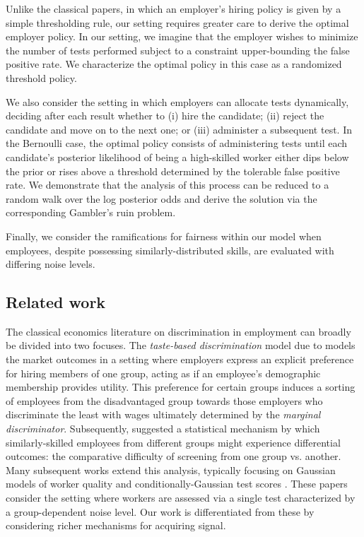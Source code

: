 Unlike the classical papers, 
in which an employer's hiring policy is given 
by a simple thresholding rule,
our setting requires greater care 
to derive the optimal employer policy. 
In our setting, we imagine that the employer 
wishes to minimize the number of tests performed
subject to a constraint upper-bounding the false positive rate.
We characterize the optimal policy in this case as a randomized threshold policy.

We also consider the setting in which employers can allocate tests dynamically, 
deciding after each result whether to 
(i) hire the candidate;
(ii) reject the candidate and move on to the next one; or 
(iii) administer a subsequent test. 
In the Bernoulli case, the optimal policy consists 
of administering tests until each candidate's posterior likelihood 
of being a high-skilled worker either 
dips below the prior or rises above a threshold 
determined by the tolerable false positive rate.
We demonstrate that the analysis of this process
can be reduced to a random walk over the log posterior odds
and derive the solution via the corresponding Gambler's ruin problem.

Finally, 
we consider the ramifications for fairness within our model 
when employees, despite possessing similarly-distributed skills, 
are evaluated with differing noise levels.

\subsection{Related work}

The classical economics literature 
on discrimination in employment 
can broadly be divided into two focuses.
The \emph{taste-based discrimination} model 
due to \cite{becker1957economics}
models the market outcomes in a setting 
where employers express an explicit preference 
for hiring members of one group,
acting as if an employee's demographic membership provides utility.
This preference for certain groups
induces a sorting of employees from the disadvantaged group
towards those employers who discriminate the least
with wages ultimately determined by the \emph{marginal discriminator}.
%
Subsequently, \cite{phelps1972statistical} suggested
a statistical mechanism by which similarly-skilled employees 
from different groups might experience differential outcomes: 
the comparative difficulty of screening from one group vs. another.
Many subsequent works extend this analysis,
typically focusing on Gaussian models of worker quality
and conditionally-Gaussian test scores 
\cite{arrow1973theory, aigner1977statistical}.
These papers consider the setting 
where workers are assessed via a single test
characterized by a group-dependent noise level.
Our work is differentiated from these 
by considering richer mechanisms for acquiring signal.

